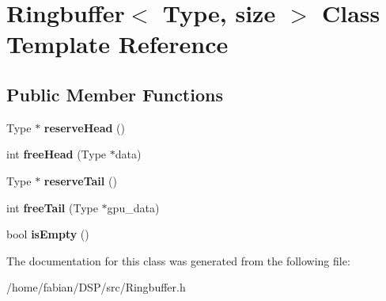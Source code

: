 \hypertarget{classRingbuffer}{\section{Ringbuffer$<$ Type, size $>$ Class Template Reference}
\label{classRingbuffer}
}
\subsection*{Public Member Functions}
\begin{DoxyCompactItemize}
\item 
\hypertarget{classRingbuffer_a7f0978d6c11cb12b9883caa69dfc71d0}{Type $\ast$ {\bfseries reserve\-Head} ()}\label{classRingbuffer_a7f0978d6c11cb12b9883caa69dfc71d0}

\item 
\hypertarget{classRingbuffer_a827be94f98570108e7efaaf2862ba82a}{int {\bfseries free\-Head} (Type $\ast$data)}\label{classRingbuffer_a827be94f98570108e7efaaf2862ba82a}

\item 
\hypertarget{classRingbuffer_a6511837e275852eee89b8d2048ba9a1e}{Type $\ast$ {\bfseries reserve\-Tail} ()}\label{classRingbuffer_a6511837e275852eee89b8d2048ba9a1e}

\item 
\hypertarget{classRingbuffer_a2e3617e49887a146de380aebdafe6296}{int {\bfseries free\-Tail} (Type $\ast$gpu\-\_\-data)}\label{classRingbuffer_a2e3617e49887a146de380aebdafe6296}

\item 
\hypertarget{classRingbuffer_a56a66fd5dd6d0f64448663f37313ea4d}{bool {\bfseries is\-Empty} ()}\label{classRingbuffer_a56a66fd5dd6d0f64448663f37313ea4d}

\end{DoxyCompactItemize}


The documentation for this class was generated from the following file\-:\begin{DoxyCompactItemize}
\item 
/home/fabian/\-D\-S\-P/src/Ringbuffer.\-h\end{DoxyCompactItemize}
